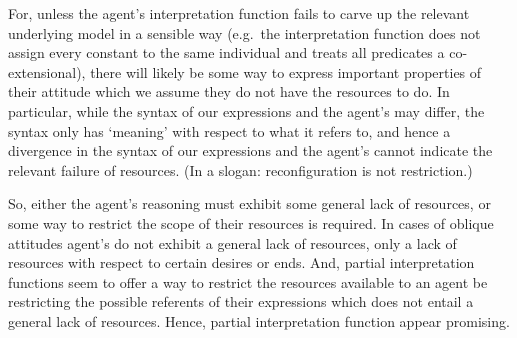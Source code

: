 \documentclass[10pt]{article}
\begin{document}
For, unless the agent's interpretation function fails to carve up the relevant underlying model in a sensible way (e.g.\ the interpretation function does not assign every constant to the same individual and treats all predicates a co-extensional), there will likely be some way to express important properties of their attitude which we assume they do not have the resources to do.
In particular, while the syntax of our expressions and the agent's may differ, the syntax only has `meaning' with respect to what it refers to, and hence a divergence in the syntax of our expressions and the agent's cannot indicate the relevant failure of resources.
(In a slogan: reconfiguration is not restriction.)

So, either the agent's reasoning must exhibit some general lack of resources, or some way to restrict the scope of their resources is required.
In cases of oblique attitudes agent's do not exhibit a general lack of resources, only a lack of resources with respect to certain desires or ends.
And, partial interpretation functions seem to offer a way to restrict the resources available to an agent be restricting the possible referents of their expressions which does not entail a general lack of resources.
Hence, partial interpretation function appear promising.
\end{document}
